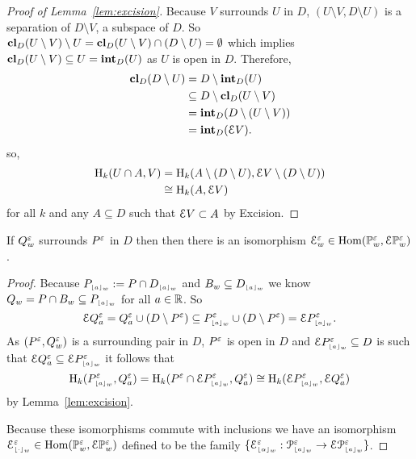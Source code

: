 \begin{proof}[Proof of Lemma~\ref{lem:excision}]
  Because $V$ surrounds $U$ in $D$, $(U\setminus V, D\setminus U)$ is a separation of $D\setminus V$, a subspace of $D$.
  So $\cl_D(U\setminus V)\setminus U = \cl_D(U\setminus V) \cap (D\setminus U) = \emptyset$ which implies $\cl_D(U\setminus V)\subseteq U = \intr_D(U)$ as $U$ is open in $D$.
  Therefore,
  \begin{align*}
    \cl_D(D\setminus U) &= D\setminus \intr_D(U)\\
                        &\subseteq D\setminus \cl_D(U\setminus V)\\
                        &= \intr_D(D\setminus (U\setminus V))\\
                        &= \intr_D(\ext{V}).
  \end{align*}
  so,
  \begin{align*}
    \hom_k(U\cap A, V) &= \hom_k(A\setminus (D\setminus U), \ext{V}\setminus (D\setminus U))\\
      &\cong \hom_k(A, \ext{V})
  \end{align*}
  for all $k$ and any $A\subseteq D$ such that $\ext{V}\subset A$ by Excision.
\end{proof}

\begin{lemma}\label{lem:extension_apply}
  If $Q_w^\e$ surrounds $P^\e$ in $D$ then then there is an isomorphism $\E_w^\e \in \Hom(\PP{w}{\e},\ext{\PP{w}{\e}})$.
\end{lemma}
\begin{proof}
  Because $P\subi{w}{a} := P\cap D\subi{w}{a}$ and $B_w\subseteq D\subi{w}{a}$ we know $Q_w = P\cap B_w \subseteq P\subi{w}{a}$ for all $a\in\R$.
  So
  \[\ext{Q^\e_a} = Q^\e_a\cup (D\setminus P^\e) \subseteq P\subi{w}{a}^\e \cup (D\setminus P^\e) = \ext{P\subi{w}{a}^\e}.\]
  As $(P^\e, Q_w^\e)$ is a surrounding pair in $D$, $P^\e$ is open in $D$ and $\ext{P\subi{w}{a}^\e}\subseteq D$ is such that $\ext{Q^\e_a}\subseteq \ext{P\subi{w}{a}^\e}$ it follows that
  \[\hom_k(P\subi{w}{a}^\e, Q^\e_a) = \hom_k(P^\e\cap \ext{P\subi{w}{a}^\e}, Q^\e_a) \cong\hom_k(\ext{P\subi{w}{a}^\e}, \ext{Q^\e_a})\]
  by Lemma~\ref{lem:excision}.

  Because these isomorphisms commute with inclusions we have an isomorphism $\E\subi{w}{\cdot}^\e \in \Hom(\PP{w}{\e},\ext{\PP{w}{\e}})$ defined to be the family $\{\E\subi{w}{\alpha}^\e : \P{w}{\e}{a}\to \E\P{w}{\e}{a}\}$.
\end{proof}

